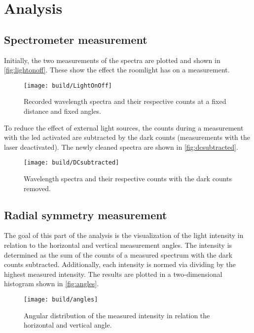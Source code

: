 \newpage
\section{Analysis}
\label{sec:Analysis}

\subsection{Spectrometer measurement}

Initially, the two measurements of the spectra are plotted and shown in \autoref{fig:lightonoff}. 
These show the effect the roomlight has on a measurement.

\begin{figure}[H]
	\centering
	\texttt{[image: build/LightOnOff]}
	\caption{Recorded wavelength spectra and their respective counts at a fixed distance and fixed angles.}
	\label{fig:lightonoff}
\end{figure}

To reduce the effect of external light sources, the counts during a measurement with the led activated are subtracted by the
dark counts (measurements with the laser deactivated). The newly cleaned spectra are shown in \autoref{fig:dcsubtracted}.

\begin{figure}[H]
	\centering
	\texttt{[image: build/DCsubtracted]}
	\caption{Wavelength spectra and their respective counts with the dark counts removed.}
	\label{fig:dcsubtracted}
\end{figure}

\subsection{Radial symmetry measurement}
The goal of this part of the analysis is the visualization of the light intensity in relation to the horizontal and vertical measurement angles.
The intensity is determined as the sum of the counts of a measured spectrum with the dark counts subtracted. 
Additionally, each intensity is normed via dividing by the highest measured intensity.
The results are plotted in a two-dimensional histogram shown in \autoref{fig:angles}.

\begin{figure}[H]
	\centering
	\texttt{[image: build/angles]}
	\caption{Angular distribution of the measured intensity in relation the horizontal and vertical angle.}
	\label{fig:angles}
\end{figure}

